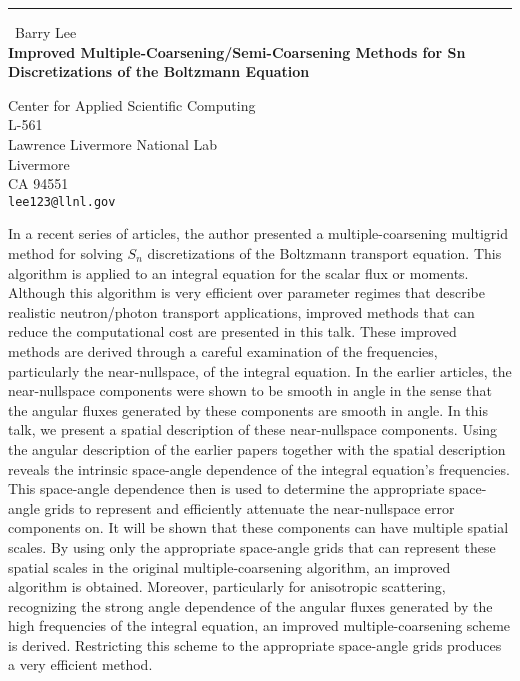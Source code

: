 \documentclass{report}
\begin{document}
\begin{center}
\rule{6in}{1pt} \
{\large Barry Lee \\
{\bf Improved Multiple-Coarsening/Semi-Coarsening Methods for Sn Discretizations of the Boltzmann Equation}}

Center for Applied Scientific Computing \\ L-561 \\ Lawrence Livermore National Lab \\ Livermore \\ CA 94551
\\
{\tt lee123@llnl.gov}\end{center}

In a recent series of articles, the author presented a
multiple-coarsening multigrid method for
solving $S_n$ discretizations of the Boltzmann transport equation. This
algorithm is applied to an
integral equation for the scalar flux or moments. Although this algorithm is very
efficient over parameter regimes that describe realistic neutron/photon
transport applications, improved methods that
can reduce the computational cost are presented in this talk. These
improved methods are derived
through a careful examination of the frequencies, particularly the
near-nullspace, of the integral equation.
In the earlier articles, the near-nullspace components were shown to be
smooth in angle in the
sense that the angular fluxes generated by these components are smooth in angle.
In this talk, we present a spatial description of these near-nullspace components.
Using the angular description of the earlier papers together
with the spatial description reveals the intrinsic space-angle dependence
of the integral equation's frequencies.
This space-angle dependence then is used to determine the appropriate
space-angle grids to represent and
efficiently attenuate the near-nullspace error components on.
It will be shown that these components can have multiple spatial scales.
By using only the appropriate space-angle grids
that can represent these spatial scales in the original multiple-coarsening
algorithm, an improved algorithm is obtained. Moreover, particularly for
anisotropic scattering, recognizing the strong angle
dependence of the angular fluxes generated by the high frequencies of the
integral equation, an improved multiple-coarsening
scheme is derived. Restricting this scheme to the
appropriate space-angle grids produces a very efficient method.
\end{document}
